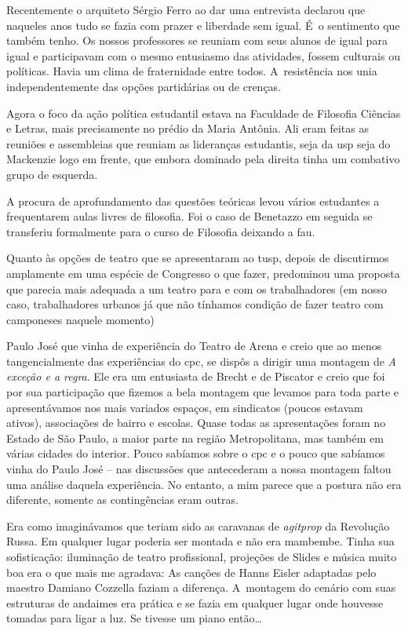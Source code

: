 Recentemente o arquiteto Sérgio Ferro ao dar uma entrevista declarou que
naqueles anos tudo se fazia com prazer e liberdade sem igual. É~o
sentimento que também tenho. Os nossos professores se reuniam com seus
alunos de igual para igual e participavam com o mesmo entusiasmo das
atividades, fossem culturais ou políticas. Havia um clima de
fraternidade entre todos. A~resistência nos unia independentemente das
opções partidárias ou de crenças.

Agora o foco da ação política estudantil estava na Faculdade de
Filosofia Ciências e Letras, mais precisamente no prédio da Maria
Antônia. Ali eram feitas as reuniões e assembleias que reuniam as
lideranças estudantis, seja da {\sc usp} seja do Mackenzie logo em frente, que
embora dominado pela direita tinha um combativo grupo de esquerda.

A procura de aprofundamento das questões teóricas levou vários
estudantes a frequentarem aulas livres de filosofia. Foi o caso de
Benetazzo em seguida se transferiu formalmente para o curso de Filosofia
deixando a {\sc fau}.

Quanto às opções de teatro que se apresentaram ao {\sc tusp}, depois de
discutirmos amplamente em uma espécie de Congresso o que fazer,
predominou uma proposta que parecia mais adequada a um teatro para e com
os trabalhadores (em nosso caso, trabalhadores urbanos já que não
tínhamos condição de fazer teatro com camponeses naquele momento)

Paulo José que vinha de experiência do Teatro de Arena e creio que ao
menos tangencialmente das experiências do {\sc cpc}, se dispôs a dirigir uma
montagem de {\it A exceção e a regra}. Ele era um entusiasta de Brecht e
de Piscator e creio que foi por sua participação que fizemos a bela
montagem que levamos para toda parte e apresentávamos nos mais variados
espaços, em sindicatos (poucos estavam ativos), associações de bairro e
escolas. Quase todas as apresentações foram no Estado de São Paulo, a
maior parte na região Metropolitana, mas também em várias cidades do
interior. Pouco sabíamos sobre o {\sc cpc} e o pouco que sabíamos vinha do
Paulo José -- nas discussões que antecederam a nossa montagem faltou uma
análise daquela experiência. No entanto, a mim parece que a postura não
era diferente, somente as contingências eram outras.

Era como imaginávamos que teriam sido as caravanas de {\it agitprop} da
Revolução Russa. Em qualquer lugar poderia ser montada e não era
mambembe. Tinha sua sofisticação: iluminação de teatro profissional,
projeções de Slides e música muito boa era o que mais me agradava: As
canções de Hanns Eisler adaptadas pelo maestro Damiano Cozzella faziam a
diferença. A~montagem do cenário com suas estruturas de andaimes era
prática e se fazia em qualquer lugar onde houvesse tomadas para ligar a
luz. Se tivesse um piano então\ldots{}

